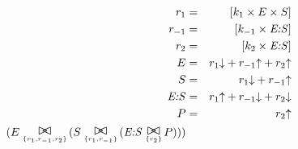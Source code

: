


\begin{eqnarray*}
r_1 & = & [ k_1 \times  E \times  S ]\\%
r_{-1} & = & [ k_{-1} \times  \hbox{\textit{E:S}} ]\\%
r_2 & = & [ k_2 \times  \hbox{\textit{E:S}} ]\\%
%
E & = & r_1{\downarrow} +  r_{-1}{\uparrow}  +  r_2{\uparrow} \\%
S & = & r_1{\downarrow}  +  r_{-1}{\uparrow} \\%
\hbox{\textit{E:S}} & = & r_1{\uparrow}  +  r_{-1}{\downarrow}  +  r_2{\downarrow} \\%
P & = & r_2{\uparrow} \\%
%
(E \sync{\{r_1, r_{-1}, r_2\}} (S \sync{\{r_1, r_{-1}\}} (\hbox{\textit{E:S}} \sync{\{r_2\}} P)))%
\end{eqnarray*}
